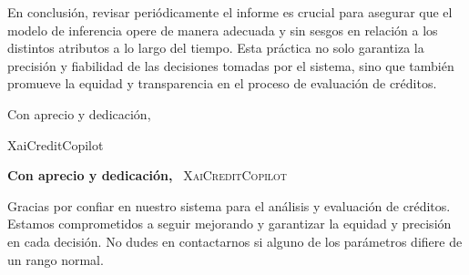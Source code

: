 \documentclass{article}
\begin{document}
En conclusión, revisar periódicamente el informe es crucial para asegurar que el modelo de inferencia opere de manera adecuada y sin sesgos en relación a los distintos atributos a lo largo del tiempo. Esta práctica no solo garantiza la precisión y fiabilidad de las decisiones tomadas por el sistema, sino que también promueve la equidad y transparencia en el proceso de evaluación de créditos.


Con aprecio y dedicación,

XaiCreditCopilot

\begin{center}
    \textbf{Con aprecio y dedicación,}\
    \vspace{0.5cm}
    \textsc{XaiCreditCopilot}\
    \vspace{0.2cm}
\end{center}

{\small
Gracias por confiar en nuestro sistema para el análisis y evaluación de créditos. Estamos comprometidos a seguir mejorando y garantizar la equidad y precisión en cada decisión. No dudes en contactarnos si alguno de los parámetros difiere de un rango normal.
}
\end{document}
